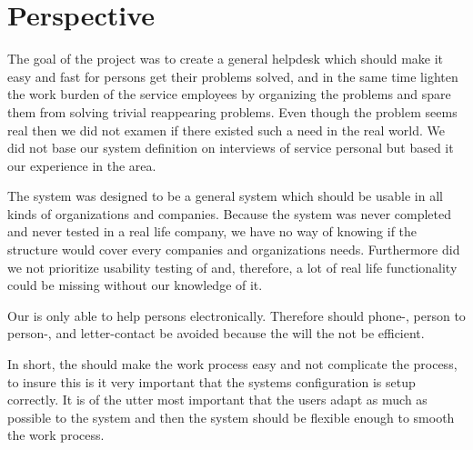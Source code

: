 \chapter{Perspective}
\label{chap:perspective}
The goal of the project was to create a general helpdesk which should make it easy and fast for persons get their problems solved, and in the same time lighten the work burden of the service employees by organizing the problems and spare them from solving trivial reappearing problems. Even though the problem seems real then we did not examen if there existed such a need in the real world. We did not base our system definition on interviews of service personal but based it our experience in the area. 

The system was designed to be a general system which should be usable in all kinds of organizations and companies. Because the system was never completed and never tested in a real life company, we have no way of knowing if the structure would cover every companies and organizations needs. Furthermore did we not prioritize usability testing of \hdesk[] and, therefore, a lot of real life functionality could be missing without our knowledge of it.   

Our \hdesk[] is only able to help persons electronically. Therefore should phone-, person to person-, and letter-contact be avoided because the \hdesk will the not be efficient.    

In short, the \hdesk[] should make the work process easy and not complicate the process, to insure this is it very important that the systems configuration is setup correctly. It is of the utter most important that the users adapt as much as possible to the system and then the system should be flexible enough to smooth the work process.   


